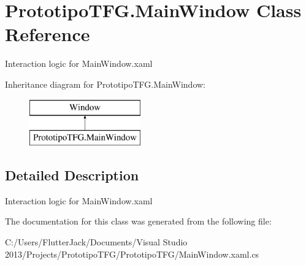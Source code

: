\hypertarget{class_prototipo_t_f_g_1_1_main_window}{}\section{Prototipo\+T\+F\+G.\+Main\+Window Class Reference}
\label{class_prototipo_t_f_g_1_1_main_window}


Interaction logic for Main\+Window.\+xaml  


Inheritance diagram for Prototipo\+T\+F\+G.\+Main\+Window\+:\begin{figure}[H]
\begin{center}
\leavevmode
\includegraphics[height=2.000000cm]{class_prototipo_t_f_g_1_1_main_window}
\end{center}
\end{figure}


\subsection{Detailed Description}
Interaction logic for Main\+Window.\+xaml 



The documentation for this class was generated from the following file\+:\begin{DoxyCompactItemize}
\item 
C\+:/\+Users/\+Flutter\+Jack/\+Documents/\+Visual Studio 2013/\+Projects/\+Prototipo\+T\+F\+G/\+Prototipo\+T\+F\+G/Main\+Window.\+xaml.\+cs\end{DoxyCompactItemize}
